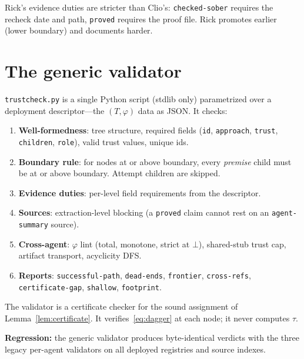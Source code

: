 \documentclass[11pt,a4paper]{article}
\newcommand{\level}[1]{\texttt{#1}}
\newcommand{\field}[1]{\texttt{#1}}
\theoremstyle{plain}
\theoremstyle{definition}
\begin{document}
Rick's evidence duties are stricter than Clio's: \level{checked-sober}
requires the recheck date and path, \level{proved} requires the proof
file. Rick promotes earlier (lower boundary) and documents harder.

\section{The generic validator}
\label{sec:validator}

\texttt{trustcheck.py} is a single Python script (stdlib only)
parametrized over a deployment descriptor---the $(T, \varphi)$ data as
JSON. It checks:

\begin{enumerate}
\item \textbf{Well-formedness}: tree structure, required fields (\field{id},
\field{approach}, \field{trust}, \field{children}, \field{role}),
valid trust values, unique ids.

\item \textbf{Boundary rule}: for nodes at or above boundary, every
\emph{premise} child must be at or above boundary. Attempt children are
skipped.

\item \textbf{Evidence duties}: per-level field requirements from the
descriptor.

\item \textbf{Sources}: extraction-level blocking (a \level{proved} claim
cannot rest on an \level{agent-summary} source).

\item \textbf{Cross-agent}: $\varphi$ lint (total, monotone, strict at
$\bot$), shared-stub trust cap, artifact transport, acyclicity DFS.

\item \textbf{Reports}: \texttt{successful-path}, \texttt{dead-ends},
\texttt{frontier}, \texttt{cross-refs}, \texttt{certificate-gap},
\texttt{shallow}, \texttt{footprint}.
\end{enumerate}

The validator is a certificate checker for the sound assignment of
Lemma~\ref{lem:certificate}. It verifies~\eqref{eq:dagger} at each node;
it never computes $\tau$.

\textbf{Regression:} the generic validator produces byte-identical
verdicts with the three legacy per-agent validators on all deployed
registries and source indexes.
\end{document}
